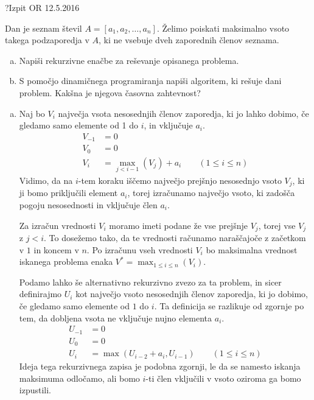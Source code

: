 \begin{naloga}{?}{Izpit OR 12.5.2016}
\begin{vprasanje}
Dan je seznam števil $A = [a_1, a_2, \dots, a_n]$.
Želimo poiskati maksimalno vsoto takega podzaporedja v $A$,
ki ne vsebuje dveh zaporednih členov seznama.

\begin{enumerate}[(a)]
\item Napiši rekurzivne enačbe za reševanje opisanega problema.

\item S pomočjo dinamičnega programiranja napiši algoritem,
ki rešuje dani problem.
Kakšna je njegova časovna zahtevnost?
\end{enumerate}
\end{vprasanje}
\begin{odgovor}

\begin{enumerate}[(a)]

\item Naj bo $V_i$ največja vsota nesosednjih členov zaporedja, ki jo lahko dobimo,
če gledamo samo elemente od 1 do $i$, in vključuje $a_i$.
\begin{align*}
V_{-1} &= 0 \\
V_0 &= 0 \\
V_i &= \max_{j < i - 1}\left(V_j\right) + a_i
\qquad (1 \le i \le n)
\end{align*}
Vidimo, da na $i$-tem koraku iščemo največjo prejšnjo nesosednjo vsoto $V_j$,
ki ji bomo priključili element $a_i$, torej izračunamo največjo vsoto, 
ki zadošča pogoju nesosednosti in vključuje člen $a_i$.

Za izračun vrednosti $V_i$ moramo imeti podane že vse prejšnje $V_j$,
torej vse $V_j$ z $j < i$.
To dosežemo tako, da te vrednosti računamo naraščajoče z začetkom v $1$ in koncem v $n$.
Po izračunu vseh vrednosti $V_i$ bo maksimalna vrednost iskanega problema
enaka $V^* = \max_{1 \leq i \leq n}(V_i)$.

Podamo lahko še alternativno rekurzivno zvezo za ta problem, in sicer 
definirajmo $U_i$ kot največjo vsoto nesosednjih členov zaporedja,
ki jo dobimo, če gledamo samo elemente od $1$ do $i$.
Ta definicija se razlikuje od zgornje po tem, da dobljena vsota ne vključuje nujno elementa $a_i$.
\begin{align*}
U_{-1} &= 0 \\
U_0 &= 0 \\
U_i &= \max\left(U_{i - 2} + a_i, U_{i - 1}\right)
\qquad (1 \le i \le n)
\end{align*}
Ideja tega rekurzivnega zapisa je podobna zgornji,
le da se namesto iska\-nja maksimuma odločamo,
ali bomo $i$-ti člen vključili v vsoto oziroma ga bomo izpustili.


\end{enumerate}
\end{odgovor}
\end{naloga}
